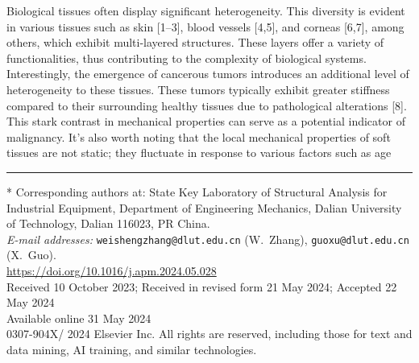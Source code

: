 \documentclass[11pt]{article}
\begin{document}
\noindent
Biological tissues often display significant heterogeneity. This
diversity is evident in various tissues such as skin [1--3], blood
vessels [4,5], and corneas [6,7], among others, which exhibit
multi-layered structures. These layers offer a variety of
functionalities, thus contributing to the complexity of biological
systems. Interestingly, the emergence of cancerous tumors introduces
an additional level of heterogeneity to these tissues. These tumors
typically exhibit greater stiffness compared to their surrounding
healthy tissues due to pathological alterations [8]. This stark
contrast in mechanical properties can serve as a potential indicator
of malignancy. It's also worth noting that the local mechanical
properties of soft tissues are not static; they fluctuate in response
to various factors such as age

\vfill
\hrule
\vspace{0.4em}
\noindent
{\footnotesize
* Corresponding authors at: State Key Laboratory of Structural
Analysis for Industrial Equipment, Department of Engineering
Mechanics, Dalian University of Technology, Dalian 116023, PR China.\\[2pt]
\textit{E-mail addresses:}
\texttt{weishengzhang@dlut.edu.cn} (W.~Zhang),
\texttt{guoxu@dlut.edu.cn} (X.~Guo).\\[4pt]
\url{https://doi.org/10.1016/j.apm.2024.05.028}\\[2pt]
Received 10 October 2023; Received in revised form 21 May 2024;
Accepted 22 May 2024\\[2pt]
Available online 31 May 2024\\[2pt]
0307-904X/\textcopyright{} 2024 Elsevier Inc. All rights are reserved,
including those for text and data mining, AI training, and similar
technologies.\par}
\end{document}
